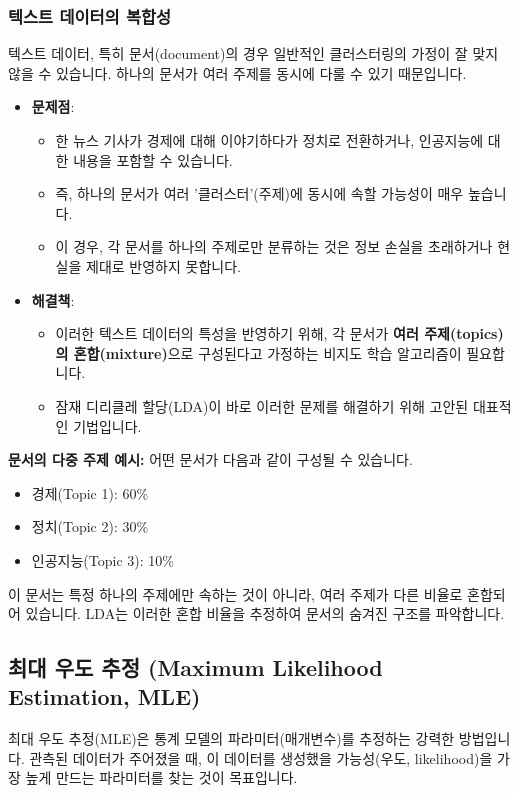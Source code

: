 \documentclass[11pt,a4paper]{article}
\begin{document}
\subsubsection*{텍스트 데이터의 복합성}
\begin{warningbox}
텍스트 데이터, 특히 문서(document)의 경우 일반적인 클러스터링의 가정이 잘 맞지 않을 수 있습니다.
하나의 문서가 여러 주제를 동시에 다룰 수 있기 때문입니다.
\end{warningbox}

\begin{itemize}
    \item \textbf{문제점}:
    \begin{itemize}
        \item 한 뉴스 기사가 경제에 대해 이야기하다가 정치로 전환하거나, 인공지능에 대한 내용을 포함할 수 있습니다.
        \item 즉, 하나의 문서가 여러 '클러스터'(주제)에 동시에 속할 가능성이 매우 높습니다.
        \item 이 경우, 각 문서를 하나의 주제로만 분류하는 것은 정보 손실을 초래하거나 현실을 제대로 반영하지 못합니다.
    \end{itemize}
    \item \textbf{해결책}:
    \begin{itemize}
        \item 이러한 텍스트 데이터의 특성을 반영하기 위해, 각 문서가 \textbf{여러 주제(topics)의 혼합(mixture)}으로 구성된다고 가정하는 비지도 학습 알고리즘이 필요합니다.
        \item 잠재 디리클레 할당(LDA)이 바로 이러한 문제를 해결하기 위해 고안된 대표적인 기법입니다.
    \end{itemize}
\end{itemize}

\begin{examplebox}
\textbf{문서의 다중 주제 예시:}
어떤 문서가 다음과 같이 구성될 수 있습니다.
\begin{itemize}
    \item 경제(Topic 1): 60\%
    \item 정치(Topic 2): 30\%
    \item 인공지능(Topic 3): 10\%
\end{itemize}
이 문서는 특정 하나의 주제에만 속하는 것이 아니라, 여러 주제가 다른 비율로 혼합되어 있습니다. LDA는 이러한 혼합 비율을 추정하여 문서의 숨겨진 구조를 파악합니다.
\end{examplebox}

\newpage
\subsection*{최대 우도 추정 (Maximum Likelihood Estimation, MLE)}
\begin{conceptbox}
최대 우도 추정(MLE)은 통계 모델의 파라미터(매개변수)를 추정하는 강력한 방법입니다.
관측된 데이터가 주어졌을 때, 이 데이터를 생성했을 가능성(우도, likelihood)을 가장 높게 만드는 파라미터를 찾는 것이 목표입니다.
\end{conceptbox}
\end{document}
